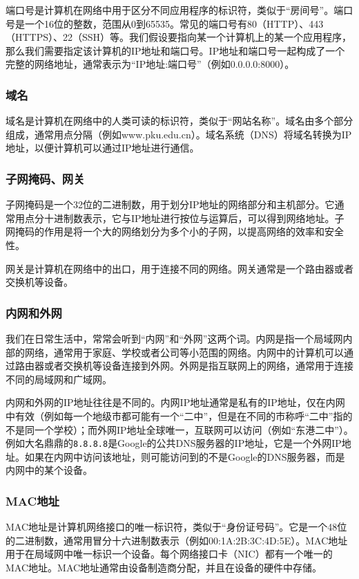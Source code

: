 端口号是计算机在网络中用于区分不同应用程序的标识符，类似于“房间号”。端口号是一个16位的整数，范围从0到65535。常见的端口号有80（HTTP）、443（HTTPS）、22（SSH）等。我们假设要指向某一个计算机上的某一个应用程序，那么我们需要指定该计算机的IP地址和端口号。IP地址和端口号一起构成了一个完整的网络地址，通常表示为“IP地址:端口号”（例如0.0.0.0:8000）。

\subsubsection{域名}
域名是计算机在网络中的人类可读的标识符，类似于“网站名称”。域名由多个部分组成，通常用点分隔（例如www.pku.edu.cn）。域名系统（DNS）将域名转换为IP地址，以便计算机可以通过IP地址进行通信。

\subsubsection{子网掩码、网关}

子网掩码是一个32位的二进制数，用于划分IP地址的网络部分和主机部分。它通常用点分十进制数表示，它与IP地址进行按位与运算后，可以得到网络地址。子网掩码的作用是将一个大的网络划分为多个小的子网，以提高网络的效率和安全性。

网关是计算机在网络中的出口，用于连接不同的网络。网关通常是一个路由器或者交换机等设备。

\subsubsection{内网和外网}

我们在日常生活中，常常会听到“内网”和“外网”这两个词。内网是指一个局域网内部的网络，通常用于家庭、学校或者公司等小范围的网络。内网中的计算机可以通过路由器或者交换机等设备连接到外网。外网是指互联网上的网络，通常用于连接不同的局域网和广域网。

内网和外网的IP地址往往是不同的。内网IP地址通常是私有的IP地址，仅在内网中有效（例如每一个地级市都可能有一个“二中”，但是在不同的市称呼“二中”指的不是同一个学校）；而外网IP地址全球唯一，互联网可以访问（例如“东港二中”）。例如大名鼎鼎的\texttt{8.8.8.8}是Google的公共DNS服务器的IP地址，它是一个外网IP地址。如果在内网中访问该地址，则可能访问到的不是Google的DNS服务器，而是内网中的某个设备。

\subsubsection{MAC地址}

MAC地址是计算机网络接口的唯一标识符，类似于“身份证号码”。它是一个48位的二进制数，通常用冒分十六进制数表示（例如00:1A:2B:3C:4D:5E）。MAC地址用于在局域网中唯一标识一个设备。每个网络接口卡（NIC）都有一个唯一的MAC地址。MAC地址通常由设备制造商分配，并且在设备的硬件中存储。

